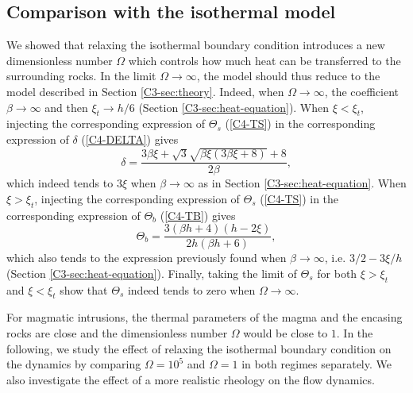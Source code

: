 \subsection{Comparison with the isothermal model}
\label{C4-sec:some-limits}

We showed that relaxing the isothermal boundary condition introduces a
new dimensionless number $\Omega$ which  controls how much heat can be
transferred    to   the    surrounding    rocks.     In   the    limit
$\Omega \rightarrow \infty$, the model should thus reduce to the model
described    in    Section    \ref{C3-sec:theory}.     Indeed,    when
$\Omega\rightarrow \infty$, the  coefficient $\beta\rightarrow \infty$
and then $\xi_t\rightarrow  h/6$ (Section \ref{C3-sec:heat-equation}).
When $\xi<\xi_t$, injecting the corresponding expression of $\Theta_s$
(\ref{C4-TS})   in   the    corresponding   expression   of   $\delta$
(\ref{C4-DELTA}) gives
\begin{equation}
  \delta =\frac{3 \beta \xi +\sqrt{3} \sqrt{\beta \xi (3 \beta \xi +8)}+8}{2 \beta },
\end{equation}
which indeed  tends to  $3\xi$ when $\beta  \rightarrow \infty$  as in
Section \ref{C3-sec:heat-equation}.   When $\xi>\xi_t$,  injecting the
corresponding   expression   of   $\Theta_s$  (\ref{C4-TS})   in   the
corresponding expression of $\Theta_b$ (\ref{C4-TB}) gives
\begin{equation}
  \Theta_b = \frac{3 (\beta  h+4) (h-2 \xi )}{2 h (\beta  h+6)},
\end{equation}
which   also   tends  to   the   expression   previously  found   when
$\beta    \rightarrow    \infty$,    i.e.     $3/2-3\xi/h$    (Section
\ref{C3-sec:heat-equation}). Finally,  taking the limit  of $\Theta_s$
for both $\xi>\xi_t$ and $\xi<\xi_t$ show that $\Theta_s$ indeed tends
to zero when $\Omega\rightarrow \infty$.

For magmatic intrusions,  the thermal parameters of the  magma and the
encasing rocks are  close and the dimensionless  number $\Omega$ would
be close to $1$. In the following, we study the effect of relaxing the
isothermal   boundary  condition   on   the   dynamics  by   comparing
$\Omega=10^5$ and  $\Omega = 1$  in both regimes separately.   We also
investigate  the effect  of  a  more realistic  rheology  on the  flow
dynamics.

